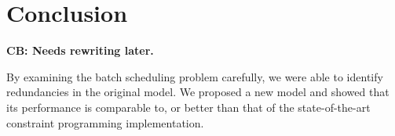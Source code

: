 \documentclass[oribibl]{llncs}
\begin{document}
\section{Conclusion} 
\label{sec:conclusion}

\textbf{CB: Needs rewriting later.}

By examining the batch scheduling problem carefully, we were able to identify
redundancies in the original model. We proposed a new model and showed that its
performance is comparable to, or better than that of the state-of-the-art
constraint programming implementation.

{}

\end{document}

